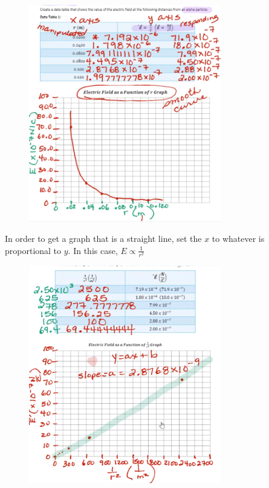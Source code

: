 \documentclass[a4paper,12pt]{article}
\begin{document}
\begin{figure}[H]
    \centering
    \includegraphics[width=0.75\textwidth]{graph1}
\end{figure}

In order to get a graph that is a straight line, set the $x$ to whatever is proportional to $y$. In this case, $E \propto \frac{1}{r^2}$

\begin{figure}[H]
    \centering
    \includegraphics[width=0.75\textwidth]{graph2}
\end{figure}
\end{document}
